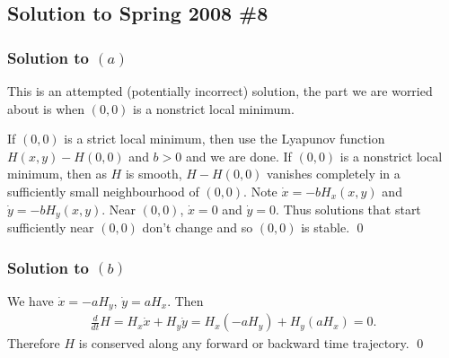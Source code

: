 \subsection*{Solution to Spring 2008 \#8}\label{s088}
\subsubsection*{Solution to $(a)$}
This is an attempted (potentially incorrect) solution, the part we are worried about is when
$(0, 0)$ is a nonstrict local minimum.

If $(0, 0)$ is a strict local minimum, then use the Lyapunov function $H(x, y) - H(0, 0)$
and $b > 0$ and we are done. If $(0, 0)$ is a nonstrict local minimum, then as $H$ is smooth,
$H - H(0, 0)$ vanishes completely in a sufficiently small neighbourhood of $(0, 0)$.
Note $\dot{x} = -bH_{x}(x, y)$ and $\dot{y} = -bH_{y}(x, y)$. Near $(0, 0)$, $\dot{x} = 0$
and $\dot{y} = 0$. Thus solutions that start sufficiently near $(0, 0)$ don't change and so $(0, 0)$
is stable.
\hfill\qed

\subsubsection*{Solution to $(b)$}
We have $\dot{x} = -aH_{y}$, $\dot{y} = aH_{x}$. Then
\begin{align*}
\frac{d}{dt}H = H_{x}\dot{x} + H_{y}\dot{y} = H_{x}(-aH_{y}) + H_{y}(aH_{x}) = 0.
\end{align*}
Therefore $H$ is conserved along any forward or backward time trajectory.
\hfill\qed

